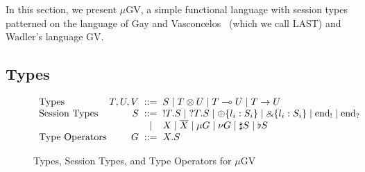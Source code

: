 \documentclass[orivec,envcountsame]{llncs}
\newcommand{\with}{\mathbin\binampersand}
\newcommand{\gvdual}[1]{\overline{#1}}
\newcommand{\gvout}[2]{{!#1.#2}}
\newcommand{\gvin}[2]{{?#1.#2}}
\newcommand{\lto}{\ensuremath{\multimap}}
\newcommand{\uto}{\ensuremath{\rightarrow}}
\newcommand{\outterm}{\mathrm{end}_!}
\newcommand{\interm}{\mathrm{end}_?}
\newcommand{\gvserver}[1]{\flat #1}
\newcommand{\gvservice}[1]{\sharp #1}
\newcommand{\mkwd}[1]{\mathsf{#1}}
\newcommand{\gvsend}[2]{\mkwd{send}\:#1\:#2}
\newcommand{\gvreceive}[1]{\mkwd{receive}\:#1}
\newcommand{\gvlet}[3]{\mkwd{let}\;#1 = #2\;\mkwd{in}\;#3}
\newcommand{\gvselect}[2]{\mkwd{select}\:#1\:#2}
\newcommand{\gvcase}[2]{\mkwd{case}\:#1\:\{#2\}}
\newcommand{\gvlink}[2]{\mkwd{link}\:#1\:#2}
\newcommand{\gvfork}[2]{\mkwd{fork}\:#1.#2}
\newcommand{\lrkwd}{\mkwd{fix}}
\newcommand{\gvfix}[3]{\lrkwd\:#1\:#2 = #3}
\newcommand{\gvletrec}[4]{\gvlet{#1}{\gvfix{#1}{#2}{#3}}{#4}}
\newcommand{\mugv}{$\mu\mathrm{GV}$\xspace}
\begin{document}
In this section, we present \mugv, a simple functional language with session types patterned on the
language of Gay and Vasconcelos~\cite{GayVasconcelos10} (which we call LAST) and Wadler's language
GV.

\subsection{Types}
\label{sec:mugv-types}

\begin{figure}\small
\[\begin{array}{l@{\hspace{1mm}}r@{\hspace{2mm}}c@{\hspace{2mm}}l}
  \text{Types}         & T,U,V & ::= & S \mid T \otimes U \mid T \lto U \mid T \uto U \\
  \text{Session Types} & S     & ::= & \gvout{T}{S} \mid \gvin{T}{S}
                                \mid   \oplus \{ l_i : S_i \} \mid \with \{ l_i : S_i \}
                                \mid   \outterm \mid \interm \\
                            & & \mid & X \mid \gvdual{X}
                                \mid   \mu G \mid \nu G
                                \mid   \gvservice{S} \mid \gvserver{S} \\
  \text{Type Operators} & G    & ::= & X.S %
\end{array}\]
\caption{Types, Session Types, and Type Operators for \mugv}
\label{fig:gv-types}
\end{figure}
\end{document}
